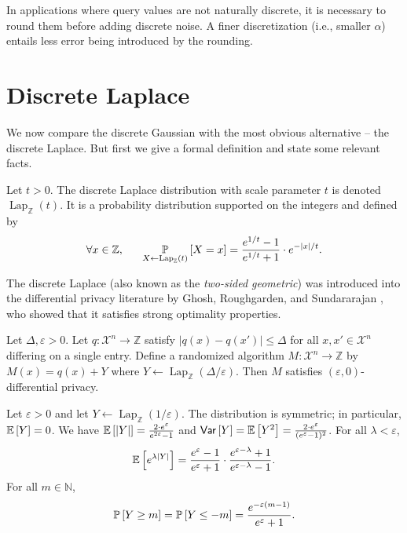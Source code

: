 \documentclass{jpcfinal} %
\newcommand{\discL}{\operatorname{Lap}_{\Z}} \newcommand{\discN}{\mathcal{N}_{\Z}}
\newcommand{\ex}[2]{{\ifx&#1& \mathbb{E} \else
\underset{#1}{\mathbb{E}} \fi \left[#2\right]}}
\newcommand{\pr}[2]{{\ifx&#1& \mathbb{P} \else
\underset{#1}{\mathbb{P}} \fi \left[#2\right]}}
\newcommand{\var}[2]{{\ifx&#1& \mathsf{Var} \else
\underset{#1}{\mathsf{Var}} \fi \left[#2\right]}}
\newcommand{\Z}{\mathbb{Z}}
\begin{document}
  
 In applications where query values are not naturally discrete, it is necessary to round them before adding discrete noise. A finer discretization (i.e., smaller $\alpha$) entails less error being introduced by the rounding.


\section{Discrete Laplace}
\label{sec:dlap}
We now compare the discrete Gaussian with the most obvious alternative -- the discrete Laplace. But first we give a formal definition and state some relevant facts.

\begin{defi}
Let $t > 0$. The discrete Laplace distribution with scale parameter $t$ is denoted $\discL(t)$. It is a probability distribution supported on the integers and defined by 
\begin{equation}
\forall x \in \Z, ~~~~~ \pr{X \gets \discL(t)}{X=x}=\frac{e^{1/t}-1}{e^{1/t}+1} \cdot e^{-|x|/t}.
\end{equation}
\end{defi}

The discrete Laplace (also known as the \emph{two-sided geometric}) was introduced into the differential privacy literature by Ghosh, Roughgarden, and Sundararajan \cite{GhoshRS12}, who showed that it satisfies strong optimality properties.

\begin{lem}
Let $\Delta,\varepsilon>0$. Let $q\colon \mathcal{X}^n \to \Z$ satisfy $|q(x)-q(x')|\le\Delta$ for all $x,x'\in\mathcal{X}^n$ differing on a single entry. Define a randomized algorithm $M\colon \mathcal{X}^n \to \Z$ by $M(x)=q(x)+Y$ where $Y \gets \discL(\Delta/\varepsilon)$. Then $M$ satisfies $(\varepsilon,0)$-differential privacy.
\end{lem}

\begin{lem}\label{lem:dlap-util}
Let $\varepsilon>0$ and let $Y \gets \discL(1/\varepsilon)$. The distribution is symmetric; in particular, $\ex{}{Y}=0$. We have $\ex{}{|Y|}=\frac{2 \cdot e^\varepsilon}{e^{2\varepsilon}-1}$ and $\var{}{Y}=\ex{}{Y^2} = \frac{2\cdot e^{\varepsilon}}{(e^{\varepsilon}-1)^2}$. For all $\lambda<\varepsilon$, $$\ex{}{e^{\lambda|Y|}} = \frac{e^{\varepsilon}-1}{e^{\varepsilon}+1} \cdot  \frac{e^{\varepsilon-\lambda}+1}{e^{\varepsilon-\lambda}-1}.$$
For all $m \in \mathbb{N}$, $$\pr{}{Y\ge m} = \pr{}{Y\le -m} = \frac{e^{-\varepsilon(m-1)}}{e^\varepsilon+1}.$$
\end{lem}
\end{document}
